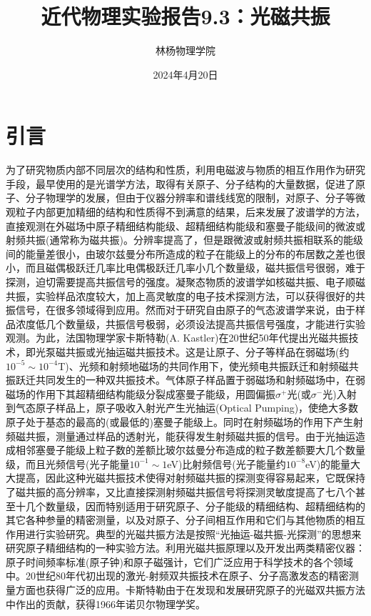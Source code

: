 \documentclass[a4paper]{article}
\title{近代物理实验报告9.3：光磁共振}
\author{林杨\quad 211840092\quad 物理学院}
\date{2024年4月20日}
\begin{document}
\maketitle


\section{引言}
为了研究物质内部不同层次的结构和性质，利用电磁波与物质的相互作用作为研究手段，最早使用的是光谱学方法，取得有关原子、分子结构的大量数据，促进了原子、分子物理学的发展，但由于仪器分辨率和谱线线宽的限制，对原子、分子等微观粒子内部更加精细的结构和性质得不到满意的结果，后来发展了波谱学的方法，直接观测在外磁场中原子精细结构能级、超精细结构能级和塞曼子能级间的微波或射频共振(通常称为磁共振)。分辨率提高了，但是跟微波或射频共振相联系的能级间的能量差很小，由玻尔兹曼分布所造成的粒子在能级上的分布的布居数之差也很小，而且磁偶极跃迁几率比电偶极跃迁几率小几个数量级，磁共振信号很弱，难于探测，迫切需要提高共振信号的强度。凝聚态物质的波谱学如核磁共振、电子顺磁共振，实验样品浓度较大，加上高灵敏度的电子技术探测方法，可以获得很好的共振信号，在很多领域得到应用。然而对于研究自由原子的气态波谱学来说，由于样品浓度低几个数量级，共振信号极弱，必须设法提高共振信号强度，才能进行实验观测。为此，法国物理学家卡斯特勒(A. Kastler)在20世纪50年代提出光磁共振技术，即光泵磁共振或光抽运磁共振技术。这是让原子、分子等样品在弱磁场(约$10^{-5}\sim 10^{-4}$T)、光频和射频地磁场的共同作用下，使光频电共振跃迁和射频磁共振跃迁共同发生的一种双共振技术。气体原子样品置于弱磁场和射频磁场中，在弱磁场的作用下其超精细结构能级分裂成塞曼子能级，用圆偏振$\sigma^{+}$光(或$\sigma^{-}$光)入射到气态原子样品上，原子吸收入射光产生光抽运(Optical Pumping)，使绝大多数原子处于基态的最高的(或最低的)塞曼子能级上。同时在射频磁场的作用下产生射频磁共振，测量通过样品的透射光，能获得发生射频磁共振的信号。由于光抽运造成相邻塞曼子能级上粒子数的差额比玻尔兹曼分布造成的粒子数差额要大几个数量级，而且光频信号(光子能量$10^{-1}\sim 1$eV)比射频信号(光子能量约$10^{-8}$eV)的能量大大提高，因此这种光磁共振技术使得对射频磁共振的探测变得容易起来，它既保持了磁共振的高分辨率，又比直接探测射频磁共振信号将探测灵敏度提高了七八个甚至十几个数量级，因而特别适用于研究原子、分子能级的精细结构、超精细结构的其它各种参量的精密测量，以及对原子、分子间相互作用和它们与其他物质的相互作用进行实验研究。典型的光磁共振方法是按照“光抽运-磁共振-光探测”的思想来研究原子精细结构的一种实验方法。利用光磁共振原理以及开发出两类精密仪器：原子时间频率标准(原子钟)和原子磁强计，它们广泛应用于科学技术的各个领域中。20世纪80年代初出现的激光-射频双共振技术在原子、分子高激发态的精密测量方面也获得广泛的应用。卡斯特勒由于在发现和发展研究原子的光磁双共振方法中作出的贡献，获得1966年诺贝尔物理学奖。
\end{document}
